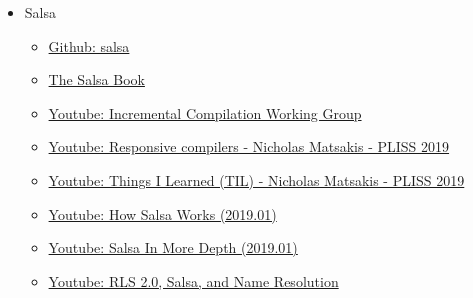 \documentclass[12pt, a4paper]{report}
\begin{document}
\begin{itemize}[noitemsep]
  \item Salsa
    \begin{itemize}[noitemsep]
    \item \href{https://github.com/salsa-rs/salsa/}{Github: salsa}
    \item \href{https://salsa-rs.github.io/salsa/}{\Square The Salsa Book}
    \item \href{https://www.youtube.com/playlist?list=PL85XCvVPmGQh0P_VEPVM2ZIlBwl4MQMNY}{\Square Youtube: Incremental Compilation Working Group}
    \item \href{https://www.youtube.com/watch?v=N6b44kMS6OM}{\CheckedBox Youtube: Responsive compilers - Nicholas Matsakis - PLISS 2019}
    \item \href{https://www.youtube.com/watch?v=LIYkT3p5gTs}{\CheckedBox Youtube: Things I Learned (TIL) - Nicholas Matsakis - PLISS 2019}
    \item \href{https://www.youtube.com/watch?v=_muY4HjSqVw}{\Square Youtube: How Salsa Works (2019.01)}
    \item \href{https://www.youtube.com/watch?v=i_IhACacPRY}{\Square Youtube: Salsa In More Depth (2019.01)}
    \item \href{https://www.youtube.com/watch?v=Xr-rBqLr-G4}{\Square Youtube: RLS 2.0, Salsa, and Name Resolution}
    \end{itemize}


\end{itemize}
\end{document}
